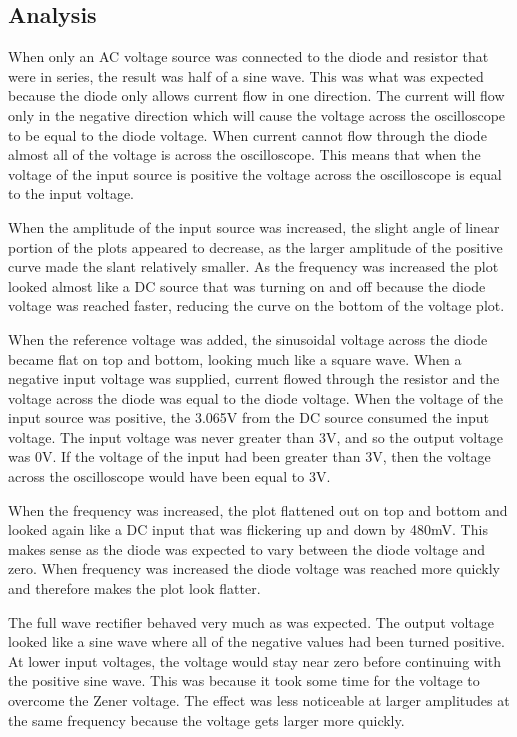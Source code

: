 \documentclass[twocolumn, amsmath]{revtex4}
\begin{document}
 
\subsection{Analysis}
When only an AC voltage source was connected to the diode and resistor that were in series, the result was half of a sine wave. This was what was expected because the diode only allows current flow in one direction. The current will flow only in the negative direction which will cause the voltage across the oscilloscope to be equal to the diode voltage. When current cannot flow through the diode almost all of the voltage is across the oscilloscope. This means that when the voltage of the input source is positive the voltage across the oscilloscope is equal to the input voltage. 

When the amplitude of the input source was increased, the slight angle of linear portion of the plots appeared to decrease, as the larger amplitude of the positive curve made the slant relatively smaller. As the frequency was increased the plot looked almost like a DC source that was turning on and off because the diode voltage was reached faster, reducing the curve on the bottom of the voltage plot.

When the reference voltage was added, the sinusoidal voltage across the diode became flat on top and bottom, looking much like a square wave. When a negative input voltage was supplied, current flowed through the resistor and the voltage across the diode %
 was equal to the diode voltage. When the voltage of the input source was positive, the 3.065V from the DC source consumed the input voltage. The input voltage was never greater than 3V, and so the output voltage was 0V. If the voltage of the input had been greater than 3V, then the voltage across the oscilloscope would have been equal to 3V.

When the frequency was increased, the plot flattened out on top and bottom and looked again like a DC input that was flickering up and down by 480mV. This makes sense as the diode was expected to vary between the diode voltage and zero. When frequency was increased the diode voltage was reached more quickly and therefore makes the plot look flatter.

The full wave rectifier behaved very much as was expected. The output voltage looked like a sine wave where all of the negative values had been turned positive. At lower input voltages, the voltage would stay near zero before continuing with the positive sine wave. This was because it took some time for the voltage to overcome the Zener voltage. The effect was less noticeable at larger amplitudes at the same frequency because the voltage gets larger more quickly.
\end{document}
